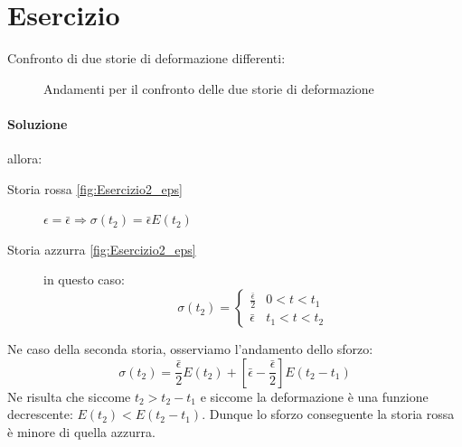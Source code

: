 \section{Esercizio}
Confronto di due storie di deformazione differenti:

\begin{figure}
\centering
{}\quad
{}
\caption{Andamenti per il confronto delle due storie di deformazione}
\label{fig:Esercizio2}
\end{figure}

\paragraph{Soluzione}
allora:
\begin{description}
\item[Storia rossa \ref{fig:Esercizio2_eps}] $\epsilon = \bar{\epsilon} \Rightarrow \sigma(t_2) = \bar{\epsilon}E(t_2)$
\item[Storia azzurra \ref{fig:Esercizio2_eps}] in questo caso:
\begin{equation}
\sigma(t_2) =%
\begin{cases}
\frac{\bar{\epsilon}}{2} &0<t<t_1\\
\bar{\epsilon} &t_1<t<t_2
\end{cases}
\end{equation}
\end{description}
Ne caso della seconda storia, osserviamo l'andamento dello sforzo:
\begin{equation}
\sigma(t_2) = \frac{\bar{\epsilon}}{2}E(t_2) + [\bar{\epsilon} - \frac{\bar{\epsilon}}{2}]E(t_2 - t_1)
\end{equation}
Ne risulta che siccome $t_2 > t_2-t_1$ e siccome la deformazione è una funzione decrescente: $E(t_2)< E(t_2-t_1)$.
Dunque lo sforzo conseguente la storia rossa è minore di quella azzurra.


